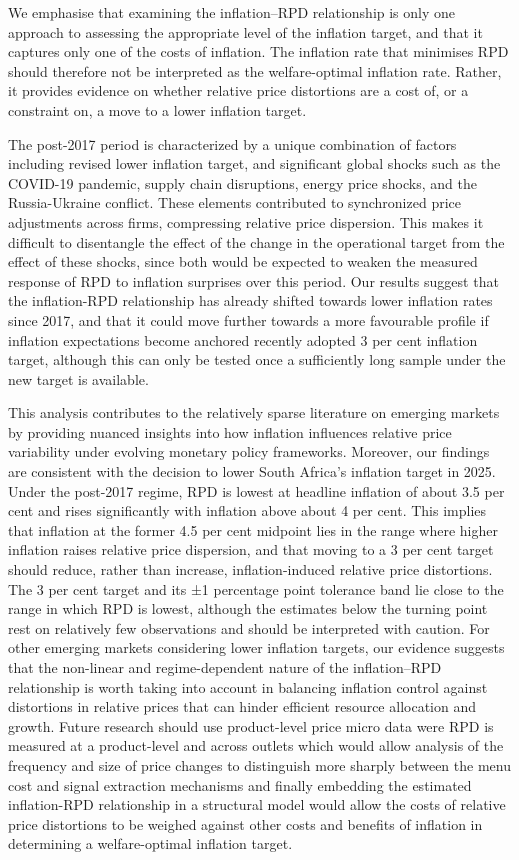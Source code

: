 \documentclass[
  letterpaper,
  DIV=11,
  numbers=noendperiod]{scrartcl}
\begin{document}
We emphasise that examining the inflation--RPD relationship is only one
approach to assessing the appropriate level of the inflation target, and
that it captures only one of the costs of inflation. The inflation rate
that minimises RPD should therefore not be interpreted as the
welfare-optimal inflation rate. Rather, it provides evidence on whether
relative price distortions are a cost of, or a constraint on, a move to
a lower inflation target.

The post-2017 period is characterized by a unique combination of factors
including revised lower inflation target, and significant global shocks
such as the COVID-19 pandemic, supply chain disruptions, energy price
shocks, and the Russia-Ukraine conflict. These elements contributed to
synchronized price adjustments across firms, compressing relative price
dispersion. This makes it difficult to disentangle the effect of the
change in the operational target from the effect of these shocks, since
both would be expected to weaken the measured response of RPD to
inflation surprises over this period. Our results suggest that the
inflation-RPD relationship has already shifted towards lower inflation
rates since 2017, and that it could move further towards a more
favourable profile if inflation expectations become anchored recently
adopted 3 per cent inflation target, although this can only be tested
once a sufficiently long sample under the new target is available.

This analysis contributes to the relatively sparse literature on
emerging markets by providing nuanced insights into how inflation
influences relative price variability under evolving monetary policy
frameworks. Moreover, our findings are consistent with the decision to
lower South Africa's inflation target in 2025. Under the post-2017
regime, RPD is lowest at headline inflation of about 3.5 per cent and
rises significantly with inflation above about 4 per cent. This implies
that inflation at the former 4.5 per cent midpoint lies in the range
where higher inflation raises relative price dispersion, and that moving
to a 3 per cent target should reduce, rather than increase,
inflation-induced relative price distortions. The 3 per cent target and
its ±1 percentage point tolerance band lie close to the range in which
RPD is lowest, although the estimates below the turning point rest on
relatively few observations and should be interpreted with caution. For
other emerging markets considering lower inflation targets, our evidence
suggests that the non-linear and regime-dependent nature of the
inflation--RPD relationship is worth taking into account in balancing
inflation control against distortions in relative prices that can hinder
efficient resource allocation and growth. Future research should use
product-level price micro data were RPD is measured at a product-level
and across outlets which would allow analysis of the frequency and size
of price changes to distinguish more sharply between the menu cost and
signal extraction mechanisms and finally embedding the estimated
inflation-RPD relationship in a structural model would allow the costs
of relative price distortions to be weighed against other costs and
benefits of inflation in determining a welfare-optimal inflation target.
\end{document}
